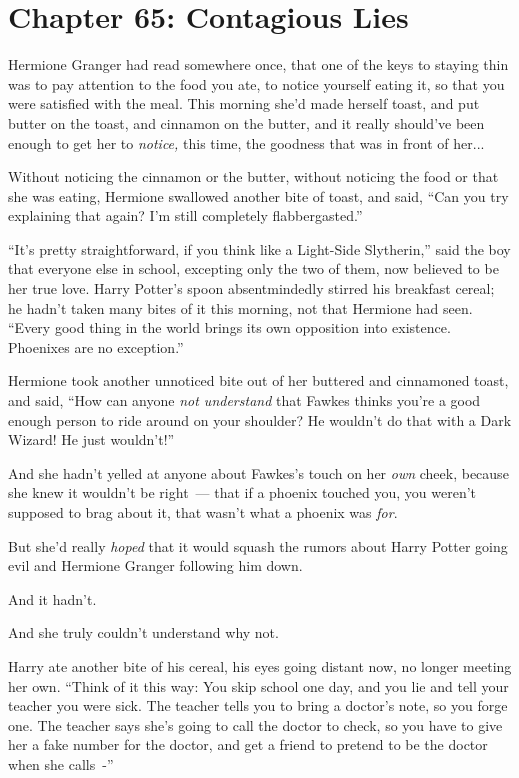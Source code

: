 \chapter{Chapter 65: Contagious Lies}
Hermione Granger had read somewhere once, that one of the keys to staying thin was to pay attention to the food you ate, to notice yourself eating it, so that you were satisfied with the meal. This morning she'd made herself toast, and put butter on the toast, and cinnamon on the butter, and it really should've been enough to get her to \emph{notice,} this time, the goodness that was in front of her...

Without noticing the cinnamon or the butter, without noticing the food or that she was eating, Hermione swallowed another bite of toast, and said, ``Can you try explaining that again? I'm still completely flabbergasted.''

``It's pretty straightforward, if you think like a Light-Side Slytherin,'' said the boy that everyone else in school, excepting only the two of them, now believed to be her true love. Harry Potter's spoon absentmindedly stirred his breakfast cereal; he hadn't taken many bites of it this morning, not that Hermione had seen. ``Every good thing in the world brings its own opposition into existence. Phoenixes are no exception.''

Hermione took another unnoticed bite out of her buttered and cinnamoned toast, and said, ``How can anyone \emph{not understand} that Fawkes thinks you're a good enough person to ride around on your shoulder? He wouldn't do that with a Dark Wizard! He just wouldn't!''

And she hadn't yelled at anyone about Fawkes's touch on her \emph{own} cheek, because she knew it wouldn't be right~--- that if a phoenix touched you, you weren't supposed to brag about it, that wasn't what a phoenix was \emph{for}.

But she'd really \emph{hoped} that it would squash the rumors about Harry Potter going evil and Hermione Granger following him down.

And it hadn't.

And she truly couldn't understand why not.

Harry ate another bite of his cereal, his eyes going distant now, no longer meeting her own. ``Think of it this way: You skip school one day, and you lie and tell your teacher you were sick. The teacher tells you to bring a doctor's note, so you forge one. The teacher says she's going to call the doctor to check, so you have to give her a fake number for the doctor, and get a friend to pretend to be the doctor when she calls~-''

